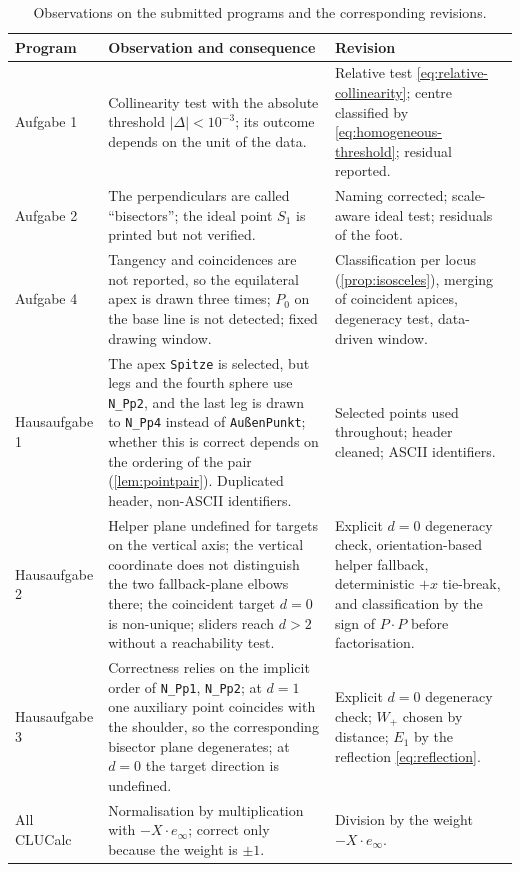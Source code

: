 \documentclass[11pt,a4paper]{article}
\theoremstyle{plain}
\theoremstyle{definition}
\theoremstyle{remark}
\newcommand{\einf}{e_{\infty}}
\newcommand{\abs}[1]{\left\lvert#1\right\rvert}
\begin{document}
\begin{table}[H]
  \centering
  \caption[Audit of the submitted programs]{Observations on the submitted programs and the corresponding
  revisions.}
  \label{tab:audit}
  \footnotesize
  \begin{tabularx}{\textwidth}{@{}>{\raggedright\arraybackslash}p{21mm}YY@{}}
    \toprule
    Program & Observation and consequence & Revision \\
    \midrule
    Aufgabe 1 & Collinearity test with the absolute threshold $\abs{\Delta}<10^{-3}$; its outcome depends on the unit of the data. & Relative test \cref{eq:relative-collinearity}; centre classified by \cref{eq:homogeneous-threshold}; residual reported. \\
    Aufgabe 2 & The perpendiculars are called ``bisectors''; the ideal point $S_1$ is printed but not verified. & Naming corrected; scale-aware ideal test; residuals of the foot. \\
    Aufgabe 4 & Tangency and coincidences are not reported, so the equilateral apex is drawn three times; $P_0$ on the base line is not detected; fixed drawing window. & Classification per locus (\cref{prop:isosceles}), merging of coincident apices, degeneracy test, data-driven window. \\
    Hausaufgabe 1 & The apex \texttt{Spitze} is selected, but legs and the fourth sphere use \texttt{N\_Pp2}, and the last leg is drawn to \texttt{N\_Pp4} instead of \texttt{AußenPunkt}; whether this is correct depends on the ordering of the pair (\cref{lem:pointpair}). Duplicated header, non-ASCII identifiers. & Selected points used throughout; header cleaned; ASCII identifiers. \\
    Hausaufgabe 2 & Helper plane undefined for targets on the vertical axis; the vertical coordinate does not distinguish the two fallback-plane elbows there; the coincident target $d=0$ is non-unique; sliders reach $d>2$ without a reachability test. & Explicit $d=0$ degeneracy check, orientation-based helper fallback, deterministic $+x$ tie-break, and classification by the sign of $P\cdot P$ before factorisation. \\
    Hausaufgabe 3 & Correctness relies on the implicit order of \texttt{N\_Pp1}, \texttt{N\_Pp2}; at $d=1$ one auxiliary point coincides with the shoulder, so the corresponding bisector plane degenerates; at $d=0$ the target direction is undefined. & Explicit $d=0$ degeneracy check; $W_+$ chosen by distance; $E_1$ by the reflection \cref{eq:reflection}. \\
    All CLUCalc & Normalisation by multiplication with $-X\cdot\einf$; correct only because the weight is $\pm1$. & Division by the weight $-X\cdot\einf$. \\
    \bottomrule
  \end{tabularx}
\end{table}
\end{document}
